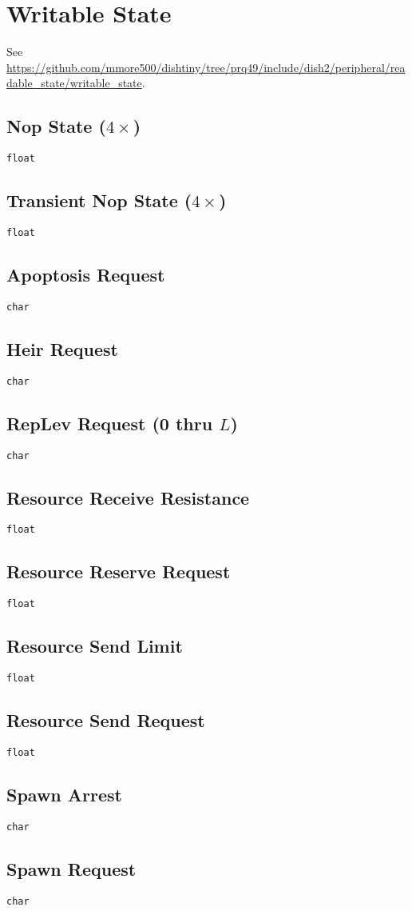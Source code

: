 \section{Writable State}

See \url{https://github.com/mmore500/dishtiny/tree/prq49/include/dish2/peripheral/readable_state/writable_state}.

\subsection{Nop State ($4\times$)}

\texttt{float}

\subsection{Transient Nop State ($4\times$)}

\texttt{float}

\subsection{Apoptosis Request}

\texttt{char}

\subsection{Heir Request}

\texttt{char}

\subsection{RepLev Request (0 thru $L$)}

\texttt{char}

\subsection{Resource Receive Resistance}

\texttt{float}

\subsection{Resource Reserve Request}

\texttt{float}

\subsection{Resource Send Limit}

\texttt{float}

\subsection{Resource Send Request}

\texttt{float}

\subsection{Spawn Arrest}

\texttt{char}

\subsection{Spawn Request}

\texttt{char}
